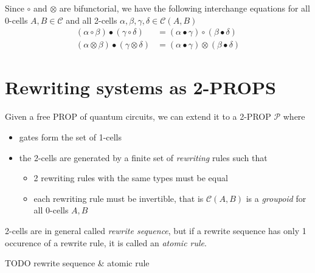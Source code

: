 \documentclass[a4paper]{article}
\begin{document}
\begin{remark}
Since $\circ$ and $\otimes$ are bifunctorial, we have the following
interchange equations for all 0-cells $A, B \in \mathcal{C}$ and all 2-cells
  $\alpha, \beta, \gamma, \delta \in \mathcal{C}(A, B)$
\begin{align}
(\alpha \circ \beta) \bullet (\gamma \circ \delta) &= (\alpha \bullet \gamma)
  \circ (\beta \bullet \delta) \\
(\alpha \otimes \beta) \bullet (\gamma \otimes \delta) &= (\alpha \bullet
  \gamma) \otimes (\beta \bullet \delta)
\end{align}
\end{remark}

\section{Rewriting systems as 2-PROPS}
\label{sec:rewriting}

\begin{definition}
Given a free PROP of quantum circuits, we can extend it to a 2-PROP
  $\mathcal{P}$ where
\begin{itemize}
\item gates form the set of 1-cells 
\item the 2-cells are generated by a finite set of \emph{rewriting} rules such
  that
\begin{itemize}
\item 2 rewriting rules with the same types must be equal
\item each rewriting rule must be invertible, that is $\mathcal{C}(A, B)$ is a
  \emph{groupoid} for all 0-cells $A, B$
\end{itemize}
\end{itemize}

2-cells are in general called \emph{rewrite sequence}, but if a rewrite sequence
  has only 1 occurence of a rewrite rule, it is called an \emph{atomic rule}.
\end{definition}

\begin{example}
TODO rewrite sequence \& atomic rule
\end{example}
\end{document}
